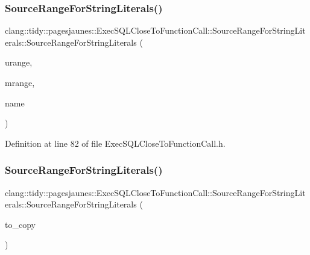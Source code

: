 \subsubsection{\texorpdfstring{Source\+Range\+For\+String\+Literals()}{SourceRangeForStringLiterals()}\hspace{0.1cm}{\footnotesize\ttfamily [2/6]}}
{\footnotesize\ttfamily clang\+::tidy\+::pagesjaunes\+::\+Exec\+S\+Q\+L\+Close\+To\+Function\+Call\+::\+Source\+Range\+For\+String\+Literals\+::\+Source\+Range\+For\+String\+Literals (\begin{DoxyParamCaption}\item[{Source\+Range}]{urange,  }\item[{Source\+Range}]{mrange,  }\item[{String\+Ref}]{name }\end{DoxyParamCaption})\hspace{0.3cm}{\ttfamily [inline]}}



Definition at line 82 of file Exec\+S\+Q\+L\+Close\+To\+Function\+Call.\+h.

\mbox{\label{classclang_1_1tidy_1_1pagesjaunes_1_1_exec_s_q_l_close_to_function_call_1_1_source_range_for_string_literals_a0d77b0cff5830af0f9d838c9d3c8f110}} 
\subsubsection{\texorpdfstring{Source\+Range\+For\+String\+Literals()}{SourceRangeForStringLiterals()}\hspace{0.1cm}{\footnotesize\ttfamily [3/6]}}
{\footnotesize\ttfamily clang\+::tidy\+::pagesjaunes\+::\+Exec\+S\+Q\+L\+Close\+To\+Function\+Call\+::\+Source\+Range\+For\+String\+Literals\+::\+Source\+Range\+For\+String\+Literals (\begin{DoxyParamCaption}\item[{\hyperlink{classclang_1_1tidy_1_1pagesjaunes_1_1_exec_s_q_l_close_to_function_call_1_1_source_range_for_string_literals}{Source\+Range\+For\+String\+Literals} \&}]{to\+\_\+copy }\end{DoxyParamCaption})\hspace{0.3cm}{\ttfamily [inline]}}



